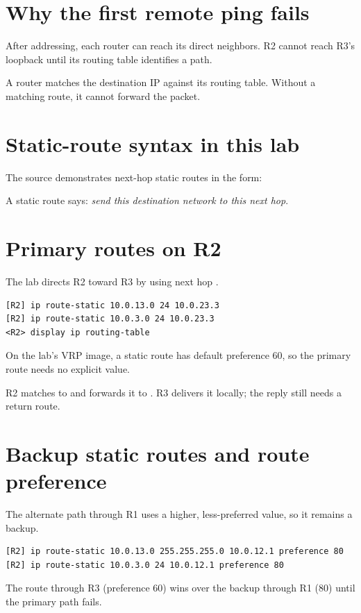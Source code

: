 
\section{Why the first remote ping fails}
After addressing, each router can reach its direct neighbors. R2 cannot reach R3's loopback  until its routing table identifies a path.


\begin{keyidea}
A router matches the destination IP against its routing table. Without a matching route, it cannot forward the packet.
\end{keyidea}

\section{Static-route syntax in this lab}
The source demonstrates next-hop static routes in the form:
\begin{center}
\end{center}
A static route says: \emph{send this destination network to this next hop}.

\section{Primary routes on R2}
The lab directs R2 toward R3 by using next hop .
\begin{lstlisting}[style=dcnterminal]
[R2] ip route-static 10.0.13.0 24 10.0.23.3
[R2] ip route-static 10.0.3.0 24 10.0.23.3
<R2> display ip routing-table
\end{lstlisting}
On the lab's VRP image, a static route has default preference 60, so the primary route needs no explicit value.

\begin{workedexample}
R2 matches  to  and forwards it to . R3 delivers it locally; the reply still needs a return route.
\end{workedexample}

\section{Backup static routes and route preference}
The alternate path through R1 uses a higher, less-preferred value, so it remains a backup.
\begin{lstlisting}[style=dcnterminal]
[R2] ip route-static 10.0.13.0 255.255.255.0 10.0.12.1 preference 80
[R2] ip route-static 10.0.3.0 24 10.0.12.1 preference 80
\end{lstlisting}
The route through R3 (preference 60) wins over the backup through R1 (80) until the primary path fails.

